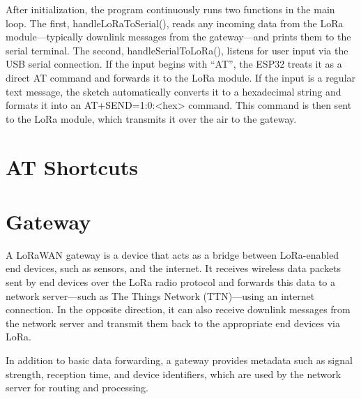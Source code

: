 After initialization, the program continuously runs two functions in the main loop. The first, handleLoRaToSerial(), reads any incoming data from the LoRa module—typically downlink messages from the gateway—and prints them to the serial terminal. The second, handleSerialToLoRa(), listens for user input via the USB serial connection. If the input begins with “AT”, the ESP32 treats it as a direct AT command and forwards it to the LoRa module. If the input is a regular text message, the sketch automatically converts it to a hexadecimal string and formats it into an AT+SEND=1:0:<hex> command. This command is then sent to the LoRa module, which transmits it over the air to the gateway.









\section{AT Shortcuts}

\section{Gateway}
A LoRaWAN gateway is a device that acts as a bridge between LoRa-enabled end devices, such as sensors, and the internet. It receives wireless data packets sent by end devices over the LoRa radio protocol and forwards this data to a network server—such as The Things Network (TTN)—using an internet connection. In the opposite direction, it can also receive downlink messages from the network server and transmit them back to the appropriate end devices via LoRa.

In addition to basic data forwarding, a gateway provides metadata such as signal strength, reception time, and device identifiers, which are used by the network server for routing and processing.

